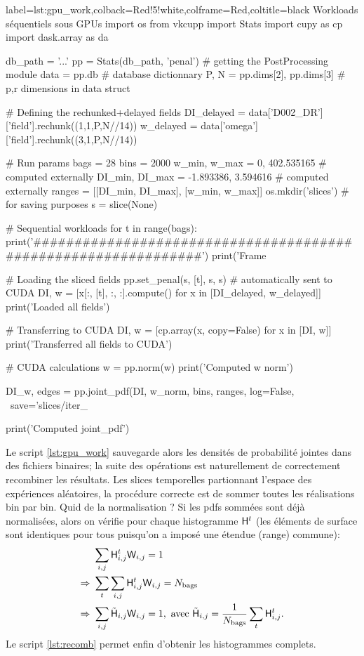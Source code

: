 \documentclass[13pt, a4paper]{extarticle}
\begin{document}
\noindent\begin{pythoncode}{label=lst:gpu_work,colback=Red!5!white,colframe=Red,coltitle=black}
  {Workloads séquentiels sous GPUs}
  import os
  from vkcupp import Stats
  import cupy as cp
  import dask.array as da

  db_path = '...'
  pp = Stats(db_path, 'penal')           # getting the PostProcessing module
  data = pp.db                           # database dictionnary
  P, N = pp.dims[2], pp.dims[3]          # p,r dimensions in data struct

  # Defining the rechunked+delayed fields
  DI_delayed = data['D002_DR']['field'].rechunk((1,1,P,N//14))          
  w_delayed = data['omega']['field'].rechunk((3,1,P,N//14)) 

  # Run params
  bags = 28
  bins = 2000
  w_min, w_max = 0, 402.535165           # computed externally
  DI_min, DI_max = -1.893386, 3.594616   # computed externally
  ranges = [[DI_min, DI_max], [w_min, w_max]]
  os.mkdir('slices')                     # for saving purposes
  s = slice(None)

  # Sequential workloads
  for t in range(bags):
    print('###############################################################')
    print('Frame %
    
    # Loading the sliced fields
    pp.set_penal(s, [t], s, s)           # automatically sent to CUDA
    DI, w = [x[:, [t], :, :].compute() for x in [DI_delayed, w_delayed]]
    print('Loaded all fields')

    # Transferring to CUDA
    DI, w = [cp.array(x, copy=False) for x in [DI, w]]
    print('Transferred all fields to CUDA')

    # CUDA calculations
    w = pp.norm(w)                       
    print('Computed w norm')

    DI_w, edges = pp.joint_pdf(DI, w_norm, bins, ranges, log=False, \
                               save='slices/iter_%
    
    print('Computed joint_pdf')
\end{pythoncode}

\noindent Le script \ref{lst:gpu_work} sauvegarde alors les densités de probabilité
jointes dans des fichiers binaires; la suite des opérations est naturellement de
correctement recombiner les résultats. Les slices temporelles partionnant l'espace
des expériences aléatoires, la procédure correcte est de sommer toutes les réalisations
bin par bin. Quid de la normalisation ? Si les pdfs sommées sont déjà normalisées,
alors on vérifie pour chaque histogramme $\mathsf{H}^t$ (les éléments de surface sont identiques
pour tous puisqu'on a imposé une étendue (range) commune):
\begin{align}
    &\sum_{i,j}\mathsf{H}^t_{i,j}\mathsf{W}_{i,j} = 1 \\
    \Rightarrow~&\sum_{t}\sum_{i,j}\mathsf{H}^t_{i,j}\mathsf{W}_{i,j} = N_{\text{bags}} \\
    \Rightarrow~&\sum_{i,j}\tilde{\mathsf{H}}_{i,j}\mathsf{W}_{i,j} = 1,~\text{avec}~
    \tilde{\mathsf{H}}_{i,j} = \dfrac{1}{N_\text{bags}}\sum_t\mathsf{H}^t_{i,j}.
\end{align}
Le script \ref{lst:recomb} permet enfin d'obtenir les histogrammes complets.
\end{document}
